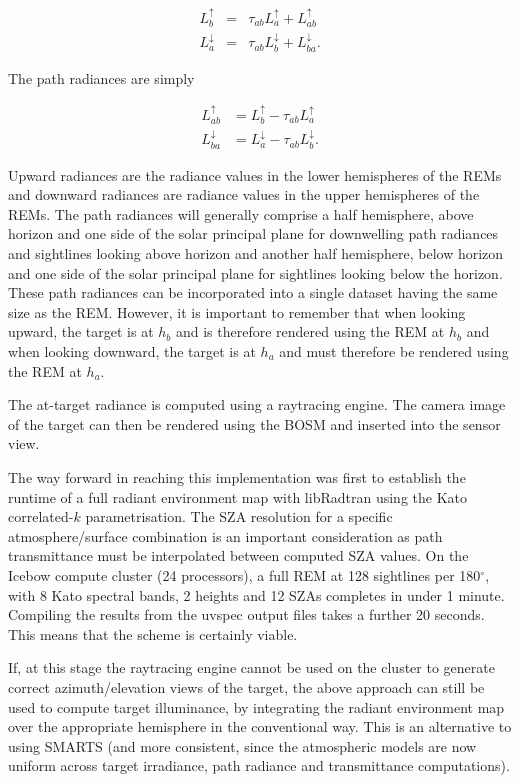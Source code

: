 \begin{eqnarray}
L_{b}^{\uparrow} & = & \tau_{ab}L_{a}^{\uparrow}+L_{ab}^{\uparrow}\\
L_{a}^{\downarrow} & = & \tau_{ab}L_{b}^{\downarrow}+L_{ba}^{\downarrow}.
\end{eqnarray}


The path radiances are simply

\begin{align}
L_{ab}^{\uparrow} & =L_{b}^{\uparrow}-\tau_{ab}L_{a}^{\uparrow}\\
L_{ba}^{\downarrow} & =L_{a}^{\downarrow}-\tau_{ab}L_{b}^{\downarrow}.
\end{align}


Upward radiances are the radiance values in the lower hemispheres
of the REMs and downward radiances are radiance values in the upper
hemispheres of the REMs. The path radiances will generally comprise
a half hemisphere, above horizon and one side of the solar principal
plane for downwelling path radiances and sightlines looking above
horizon and another half hemisphere, below horizon and one side of
the solar principal plane for sightlines looking below the horizon.
These path radiances can be incorporated into a single dataset having
the same size as the REM. However, it is important to remember that
when looking upward, the target is at $h_{b}$ and is therefore rendered
using the REM at $h_{b}$ and when looking downward, the target is
at $h_{a}$ and must therefore be rendered using the REM at $h_{a}$. 

The at-target radiance is computed using a raytracing engine. The
camera image of the target can then be rendered using the BOSM and
inserted into the sensor view.

The way forward in reaching this implementation was first to establish
the runtime of a full radiant environment map with libRadtran using
the Kato correlated-$k$ parametrisation. The SZA resolution for a
specific atmosphere/surface combination is an important consideration
as path transmittance must be interpolated between computed SZA values.
On the Icebow compute cluster (24 processors), a full REM at 128 sightlines
per 180$^{\circ}$, with 8 Kato spectral bands, 2 heights and 12 SZAs
completes in under 1 minute. Compiling the results from the uvspec
output files takes a further 20 seconds. This means that the scheme
is certainly viable.

If, at this stage the raytracing engine cannot be used on the cluster
to generate correct azimuth/elevation views of the target, the above
approach can still be used to compute target illuminance, by integrating
the radiant environment map over the appropriate hemisphere in the
conventional way. This is an alternative to using SMARTS (and more
consistent, since the atmospheric models are now uniform across target
irradiance, path radiance and transmittance computations). 

